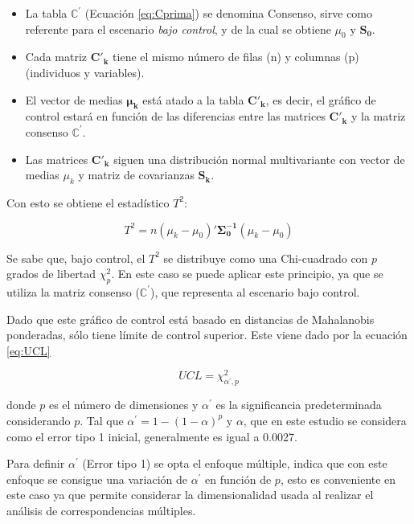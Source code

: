 \documentclass[water,article,submit,moreauthors,pdftex]{mdpi}
\providecommand{\tightlist}{%
  \setlength{\itemsep}{0pt}\setlength{\parskip}{4pt}}
\begin{document}
\begin{itemize}
\tightlist
\item
  La tabla \(\mathbb{C}^{'}\) (Ecuación \ref{eq:Cprima}) se denomina
  Consenso, sirve como referente para el escenario \emph{bajo control},
  y de la cual se obtiene \(\mu_{0}\) y \(\mathbf{S_0}\).\\
\item
  Cada matriz \(\mathbf{C'_k}\) tiene el mismo número de filas (n) y
  columnas (p) (individuos y variables).
\item
  El vector de medias \(\mathbf{\mu_k}\) está atado a la tabla
  \(\mathbf{C'_k}\), es decir, el gráfico de control estará en función
  de las diferencias entre las matrices \(\mathbf{C'_k}\) y la matriz
  consenso \(\mathbf{\mathbb{C^{'}}}\).
\item
  Las matrices \(\mathbf{C'_k}\) siguen una distribución normal
  multivariante con vector de medias \(\mu_{k}\) y matriz de covarianzas
  \(\mathbf{S_k}\).
\end{itemize}

Con esto se obtiene el estadístico \(T^2\):

\begin{equation}
T^2=n (\mu_{k}-\mu_{0})'\mathbf{\Sigma_{0}^{-1}}(\mu_{k}-\mu_{0})
\label{eq:T2}
\end{equation}

Se sabe que, bajo control, el \(T^2\) se distribuye como una
Chi-cuadrado con \(p\) grados de libertad \(\chi^2_p\). En este caso se
puede aplicar este principio, ya que se utiliza la matriz consenso
(\(\mathbb{C}^{'}\)), que representa al escenario bajo control.

Dado que este gráfico de control está basado en distancias de
Mahalanobis ponderadas, sólo tiene límite de control superior. Este
viene dado por la ecuación \ref{eq:UCL}

\begin{equation}
UCL=\chi^2_{\alpha^{'},p}
\label{eq:UCL}
\end{equation}

donde \(p\) es el número de dimensiones y \(\alpha^{'}\) es la
significancia predeterminada considerando \(p\). Tal que
\(\alpha^{'}=1-(1-\alpha)^{p}\) y \(\alpha\), que en este estudio se
considera como el error tipo 1 inicial, generalmente es igual a 0.0027.

Para definir \(\alpha^{'}\) (Error tipo 1) se opta el enfoque múltiple,
\citet{montgomery2012statistical} indica que con este enfoque se
consigue una variación de \(\alpha^{'}\) en función de \(p\), esto es
conveniente en este caso ya que permite considerar la dimensionalidad
usada al realizar el análisis de correspondencias múltiples.
\end{document}
